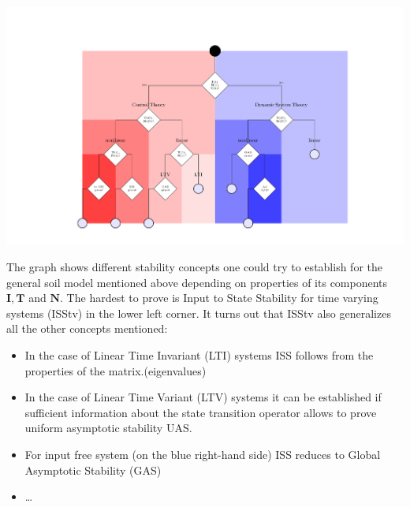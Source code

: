 
\begin{center}
\includegraphics[width=\columnwidth,clip=true,trim=4.5cm 1cm 3.2cm 2cm]{Fig1.pdf}
\end{center}

\noindent
The graph shows different stability concepts one could try to establish for the
general soil model mentioned above depending on properties of its components 
$\mathbf{I},\mathbf{T}$ and $ \mathbf{N}$. The hardest to prove is Input to
State Stability for time varying systems (ISStv) in the lower left corner.  It
turns out that ISStv also generalizes all the other concepts mentioned:
\begin{itemize}
\item 
In the case of Linear Time Invariant (LTI) systems  ISS follows from the properties of the matrix.(eigenvalues)
\item 
In the case of Linear Time Variant (LTV) systems it can be established if sufficient information about the 
state transition operator allows to prove uniform asymptotic stability UAS.
\item
For input free system (on the blue right-hand side) ISS reduces to Global Asymptotic Stability (GAS)
\item
\dots

\end{itemize}

